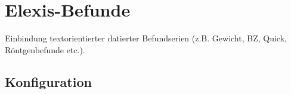 
\section{Elexis-Befunde}
\label{befunde}
Einbindung textorientierter datierter Befundserien (z.B. Gewicht, BZ, Quick, Röntgenbefunde etc.). \subsection{Konfiguration}

